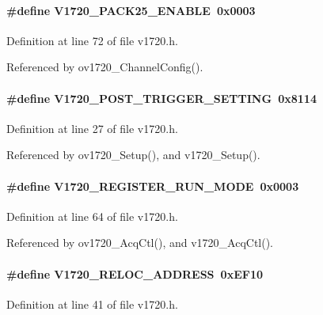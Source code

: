 \paragraph[{V1720\_\-PACK25\_\-ENABLE}]{\setlength{\rightskip}{0pt plus 5cm}\#define V1720\_\-PACK25\_\-ENABLE~0x0003}\hfill\label{v1720_8h_a84240916c0a9cb1a5f523fccd2cd10ab}


Definition at line 72 of file v1720.h.

Referenced by ov1720\_\-ChannelConfig().
\paragraph[{V1720\_\-POST\_\-TRIGGER\_\-SETTING}]{\setlength{\rightskip}{0pt plus 5cm}\#define V1720\_\-POST\_\-TRIGGER\_\-SETTING~0x8114}\hfill\label{v1720_8h_ada9cb673e1dec19b04e579afa9b83274}


Definition at line 27 of file v1720.h.

Referenced by ov1720\_\-Setup(), and v1720\_\-Setup().
\paragraph[{V1720\_\-REGISTER\_\-RUN\_\-MODE}]{\setlength{\rightskip}{0pt plus 5cm}\#define V1720\_\-REGISTER\_\-RUN\_\-MODE~0x0003}\hfill\label{v1720_8h_a10490ee2e802f0fd6d2bb1509ba953c3}


Definition at line 64 of file v1720.h.

Referenced by ov1720\_\-AcqCtl(), and v1720\_\-AcqCtl().
\paragraph[{V1720\_\-RELOC\_\-ADDRESS}]{\setlength{\rightskip}{0pt plus 5cm}\#define V1720\_\-RELOC\_\-ADDRESS~0xEF10}\hfill\label{v1720_8h_a49d7cb4f9f5d88b58119f9455f71865a}


Definition at line 41 of file v1720.h.
